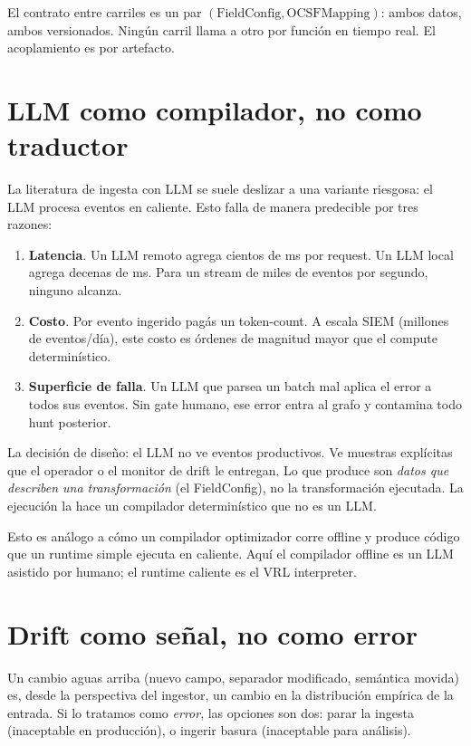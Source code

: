 El contrato entre carriles es un par
$(\text{FieldConfig}, \text{OCSFMapping})$: ambos datos, ambos
versionados. Ningún carril llama a otro por función en tiempo real.
El acoplamiento es por artefacto.

\section{LLM como compilador, no como traductor}

La literatura de ingesta con LLM se suele deslizar a una variante
riesgosa: el LLM procesa eventos en caliente. Esto falla de
manera predecible por tres razones:

\begin{enumerate}
    \item \textbf{Latencia}. Un LLM remoto agrega cientos de ms por
    request. Un LLM local agrega decenas de ms. Para un stream de
    miles de eventos por segundo, ninguno alcanza.
    \item \textbf{Costo}. Por evento ingerido pagás un token-count.
    A escala SIEM (millones de eventos/día), este costo es órdenes
    de magnitud mayor que el compute determinístico.
    \item \textbf{Superficie de falla}. Un LLM que parsea un batch
    mal aplica el error a todos sus eventos. Sin gate humano, ese
    error entra al grafo y contamina todo hunt posterior.
\end{enumerate}

La decisión de diseño: el LLM no ve eventos productivos. Ve
muestras explícitas que el operador o el monitor de drift le
entregan. Lo que produce son \emph{datos que describen una
transformación} (el FieldConfig), no la transformación ejecutada.
La ejecución la hace un compilador determinístico que no es un
LLM.

Esto es análogo a cómo un compilador optimizador corre offline y
produce código que un runtime simple ejecuta en caliente. Aquí el
compilador offline es un LLM asistido por humano; el runtime
caliente es el VRL interpreter.

\section{Drift como señal, no como error}

Un cambio aguas arriba (nuevo campo, separador modificado, semántica
movida) es, desde la perspectiva del ingestor, un cambio en la
distribución empírica de la entrada. Si lo tratamos como
\emph{error}, las opciones son dos: parar la ingesta (inaceptable en
producción), o ingerir basura (inaceptable para análisis).

